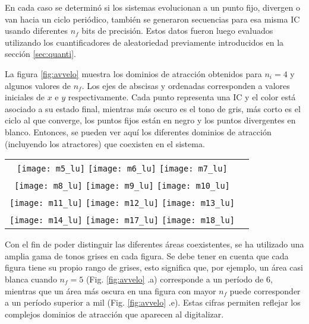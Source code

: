 En cada caso se determinó si los sistemas evolucionan a un punto fijo, divergen o van hacia un ciclo periódico, también se generaron secuencias para esa misma IC usando diferentes $n_f$ bits de precisión.
Estos datos fueron luego evaluados utilizando los cuantificadores de aleatoriedad previamente introducidos en la sección \ref{sec:quanti}.

La figura \ref{fig:avvelo} muestra los dominios de atracción obtenidos para $n_i = 4$ y algunos valores de $n_f$.
Los ejes de abscisas y ordenadas corresponden a valores iniciales de $x$ e $y$ respectivamente.
Cada punto representa una IC y el color está asociado a su estado final, mientras más oscuro es el tono de gris, más corto es el ciclo al que converge, los puntos fijos están en negro y los puntos divergentes en blanco.
Entonces, se pueden ver aquí los diferentes dominios de atracción (incluyendo los atractores) que coexisten en el sistema.
%
\begin{figure*}
	\centering
	\begin{tabular}{cc}
		\texttt{[image: m5\_lu]}
		\texttt{[image: m6\_lu]}
		\texttt{[image: m7\_lu]}\\
		\texttt{[image: m8\_lu]}
		\texttt{[image: m9\_lu]}
		\texttt{[image: m10\_lu]}\\
		\texttt{[image: m11\_lu]}
		\texttt{[image: m12\_lu]}
		\texttt{[image: m13\_lu]}\\
		\texttt{[image: m14\_lu]}
		\texttt{[image: m17\_lu]}
		\texttt{[image: m18\_lu]}\\
	\end{tabular}
	\caption{Áreas coexistentes en el dominio de atracción para: (a) $n_f=5$, (b) $n_f=6$, (c) $n_f=7$, (d) $n_f=8$, (e) $n_f=9$, (f) $n_f=10$, (g) $n_f=11$, (h) $n_f=12$, (i) $n_f=13$, (j) $n_f=14$, (k) $n_f=17$, (l) $n_f=18$.}
	\label{fig:avvelo}
\end{figure*}

Con el fin de poder distinguir las diferentes áreas coexistentes, se ha utilizado una amplia gama de tonos grises en cada figura.
Se debe tener en cuenta que cada figura tiene su propio rango de grises, esto significa que, por ejemplo, un área casi blanca cuando $n_f = 5$ (Fig. \ref{fig:avvelo} .a) corresponde a un período de $6$, mientras que un área más oscura en una figura con mayor $n_f$ puede corresponder a un período superior a mil (Fig. \ref{fig:avvelo} .e).
Estas cifras permiten reflejar los complejos dominios de atracción que aparecen al digitalizar.

